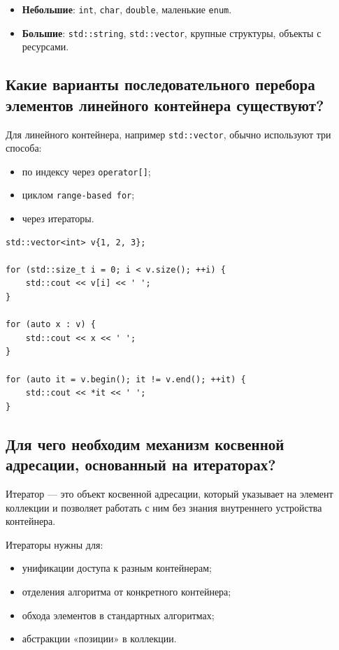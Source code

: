 \begin{itemize}
    \item \textbf{Небольшие}: \texttt{int}, \texttt{char}, \texttt{double}, маленькие \texttt{enum}.
    \item \textbf{Большие}: \texttt{std::string}, \texttt{std::vector}, крупные структуры, объекты с ресурсами.
\end{itemize}

\subsection{Какие варианты последовательного перебора элементов линейного контейнера существуют?}
Для линейного контейнера, например \texttt{std::vector}, обычно используют три способа:
\begin{itemize}
    \item по индексу через \texttt{operator[]};
    \item циклом \texttt{range-based for};
    \item через итераторы.
\end{itemize}

\begin{example}
\begin{verbatim}
std::vector<int> v{1, 2, 3};

for (std::size_t i = 0; i < v.size(); ++i) {
    std::cout << v[i] << ' ';
}

for (auto x : v) {
    std::cout << x << ' ';
}

for (auto it = v.begin(); it != v.end(); ++it) {
    std::cout << *it << ' ';
}
\end{verbatim}
\end{example}

\subsection{Для чего необходим механизм косвенной адресации, основанный на итераторах?}
\begin{definition}[Итератор]
Итератор — это объект косвенной адресации, который указывает на элемент коллекции и позволяет работать с ним без знания внутреннего устройства контейнера.
\end{definition}

Итераторы нужны для:
\begin{itemize}
    \item унификации доступа к разным контейнерам;
    \item отделения алгоритма от конкретного контейнера;
    \item обхода элементов в стандартных алгоритмах;
    \item абстракции «позиции» в коллекции.
\end{itemize}


